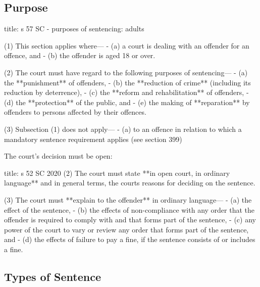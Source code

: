 \documentclass[
]{article}
\newenvironment{Shaded}{}{}
\newcommand{\NormalTok}[1]{#1}
\begin{document}
\hypertarget{purpose}{%
\subsection{Purpose}\label{purpose}}

\begin{Shaded}
\begin{Highlighting}[]
\NormalTok{title: s 57 SC {-} purposes of sentencing: adults}

\NormalTok{(1) This section applies where—}
\NormalTok{{-} (a) a court is dealing with an offender for an offence, and}
\NormalTok{{-} (b) the offender is aged 18 or over.}

\NormalTok{(2) The court must have regard to the following purposes of sentencing—}
\NormalTok{{-} (a) the **punishment** of offenders,}
\NormalTok{{-} (b) the **reduction of crime** (including its reduction by deterrence),}
\NormalTok{{-} (c) the **reform and rehabilitation** of offenders,}
\NormalTok{{-} (d) the **protection** of the public, and}
\NormalTok{{-} (e) the making of **reparation** by offenders to persons affected by their offences.}

\NormalTok{(3) Subsection (1) does not apply—}
\NormalTok{{-} (a) to an offence in relation to which a mandatory sentence requirement applies (see section 399)}
\end{Highlighting}
\end{Shaded}

The court's decision must be open:

\begin{Shaded}
\begin{Highlighting}[]
\NormalTok{title: s 52 SC 2020}
\NormalTok{(2) The court must state **in open court, in ordinary language** and in general terms, the court\textquotesingle{}s reasons for deciding on the sentence.}

\NormalTok{(3) The court must **explain to the offender** in ordinary language—}
\NormalTok{{-} (a) the effect of the sentence,}
\NormalTok{{-} (b) the effects of non{-}compliance with any order that the offender is required to comply with and that forms part of the sentence,}
\NormalTok{{-} (c) any power of the court to vary or review any order that forms part of the sentence, and}
\NormalTok{{-} (d) the effects of failure to pay a fine, if the sentence consists of or includes a fine.}
\end{Highlighting}
\end{Shaded}

\hypertarget{types-of-sentence}{%
\subsection{Types of Sentence}\label{types-of-sentence}}
\end{document}
